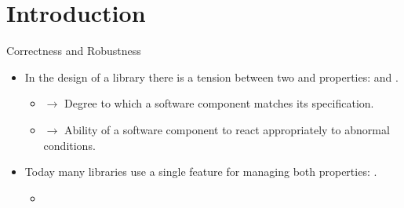\section{Introduction}

\begin{frame}[t]{Correctness and Robustness}
\begin{itemize}
  \item In the design of a library there is a tension between two 
and  properties:  and .

  \vfill
  \begin{itemize}

    \pause
    \item {} $\rightarrow$ Degree to which a software
component matches its specification.

    \pause
    \item {} $\rightarrow$ Ability of a software component to
react appropriately to abnormal conditions.

  \end{itemize}

  \vfill
  \pause
  \item Today many libraries use a single feature for managing both properties:
        .
    \begin{itemize}
      \item {}
    \end{itemize}

\end{itemize}
\end{frame}

